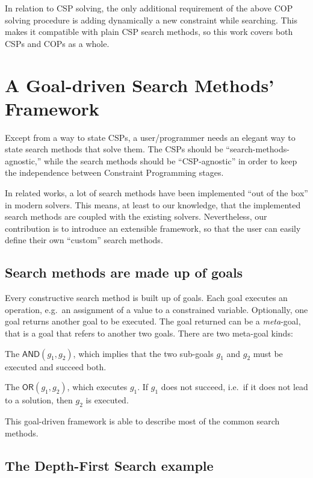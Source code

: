 \documentclass{ws-ijait}
\begin{document}
In relation to CSP solving, the only additional requirement
of the above COP solving procedure is adding dynamically a
new constraint while searching. This makes it compatible
with plain CSP search methods, so this work covers both CSPs
and COPs as a whole.


\section{A Goal-driven Search Methods'
         Framework\label{search-framework}}

Except from a way to state CSPs, a user\slash programmer
needs an elegant way to state search methods that solve
them. The CSPs should be ``search-methods-agnostic,'' while
the search methods should be ``CSP-agnostic'' in order to
keep the independence between Constraint Programming stages.

In related works, a lot of search methods have been
implemented ``out of the box'' in modern
solvers.\cite{Gecode2017} This means, at least to our
knowledge, that the implemented search methods are coupled
with the existing solvers. Nevertheless, our contribution is
to introduce an extensible framework, so that the user can
easily define their own ``custom'' search methods.

\subsection{Search methods are made up of goals}

Every constructive search method is built up of goals. Each
goal executes an operation, e.g.\ an assignment of a value
to a constrained variable. Optionally, one goal returns
another goal to be executed. The goal returned can be a
\emph{meta}-goal, that is a goal that refers to another two
goals. There are two meta-goal kinds:
\begin{romanlist}
  \item The $\mathsf{AND}(g_1,g_2)$, which implies that the
        two sub-goals $g_1$ and $g_2$ must be executed and
        succeed both.
  \item The $\mathsf{OR}(g_1,g_2)$, which executes $g_1$. If
        $g_1$ does not succeed, i.e.\ if it does not lead to
        a solution, then $g_2$ is executed.
\end{romanlist}
This goal-driven framework is able to describe most of the
common search methods.

\subsection{The Depth-First Search example}
\end{document}
